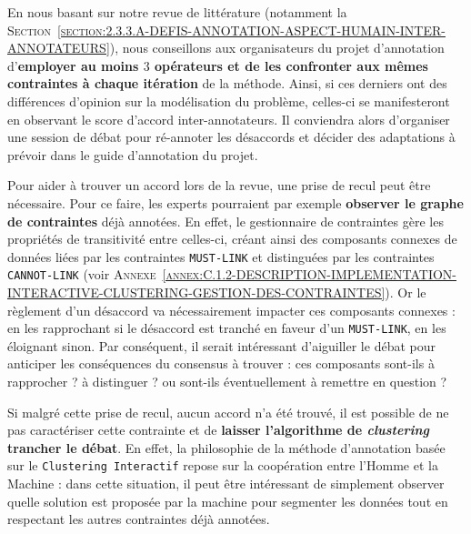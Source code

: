 			En nous basant sur notre revue de littérature (notamment la \textsc{Section~\ref{section:2.3.3.A-DEFIS-ANNOTATION-ASPECT-HUMAIN-INTER-ANNOTATEURS}}), nous conseillons aux organisateurs du projet d'annotation d'\textbf{employer au moins $3$ opérateurs et de les confronter aux mêmes contraintes à chaque itération} de la méthode.
			Ainsi, si ces derniers ont des différences d'opinion sur la modélisation du problème, celles-ci se manifesteront en observant le score d'accord inter-annotateurs.
			Il conviendra alors d'organiser une session de débat pour ré-annoter les désaccords et décider des adaptations à prévoir dans le guide d'annotation du projet.
			\begin{leftBarIdea}
				Pour aider à trouver un accord lors de la revue, une prise de recul peut être nécessaire.
				Pour ce faire, les experts pourraient par exemple \textbf{observer le graphe de contraintes} déjà annotées.
				En effet, le gestionnaire de contraintes gère les propriétés de transitivité entre celles-ci, créant ainsi des composants connexes de données liées par les contraintes \texttt{MUST-LINK} et distinguées par les contraintes \texttt{CANNOT-LINK} (voir \textsc{Annexe~\ref{annex:C.1.2-DESCRIPTION-IMPLEMENTATION-INTERACTIVE-CLUSTERING-GESTION-DES-CONTRAINTES}}).
				Or le règlement d'un désaccord va nécessairement impacter ces composants connexes : en les rapprochant si le désaccord est tranché en faveur d'un \texttt{MUST-LINK}, en les éloignant sinon.
				Par conséquent, il serait intéressant d'aiguiller le débat pour anticiper les conséquences du consensus à trouver : ces composants sont-ils à rapprocher ? à distinguer ? ou sont-ils 
				éventuellement à remettre en question ?

				Si malgré cette prise de recul, aucun accord n'a été trouvé, il est possible de ne pas caractériser cette contrainte et de \textbf{laisser l'algorithme de \textit{clustering} trancher le débat}.
				En effet, la philosophie de la méthode d'annotation basée sur le \texttt{Clustering Interactif} repose sur la coopération entre l'Homme et la Machine : dans cette situation, il peut être intéressant de simplement observer quelle solution est proposée par la machine pour segmenter les données tout en respectant les autres contraintes déjà annotées.
			\end{leftBarIdea}
			
